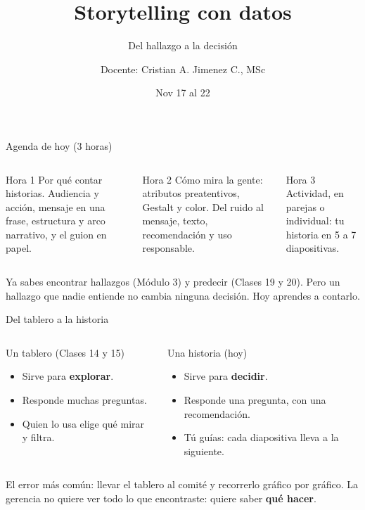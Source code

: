 \documentclass[aspectratio=169,11pt]{beamer}
\title{Storytelling con datos}
\subtitle{Del hallazgo a la decisión}
\author{Docente: Cristian A. Jimenez C., MSc}
\date{Nov 17 al 22}
\begin{document}
{
\begin{frame}
  \titlepage
\end{frame}
}

\begin{frame}[t]{Agenda de hoy (3 horas)}
  \begin{columns}[T,onlytextwidth]
    \begin{block}{Hora 1}
      \small Por qué contar historias. Audiencia y acción, mensaje en una
      frase, estructura y arco narrativo, y el guion en papel.
    \end{block}
    \begin{block}{Hora 2}
      \small Cómo mira la gente: atributos preatentivos, Gestalt y color.
      Del ruido al mensaje, texto, recomendación y uso responsable.
    \end{block}
    \begin{block}{Hora 3}
      \small Actividad, en parejas o individual: tu historia en 5 a 7
      diapositivas.
    \end{block}
  \end{columns}
  \vspace{0.3cm}
  \small Ya sabes encontrar hallazgos (Módulo 3) y predecir (Clases 19 y
  20). Pero un hallazgo que nadie entiende no cambia ninguna decisión. Hoy
  aprendes a contarlo.
\end{frame}

\begin{frame}[t]{Del tablero a la historia}
  \begin{columns}[T,onlytextwidth]
    \begin{block}{Un tablero (Clases 14 y 15)}
      \small
      \begin{itemize}
        \small
        \item Sirve para \textbf{explorar}.
        \item Responde muchas preguntas.
        \item Quien lo usa elige qué mirar y filtra.
      \end{itemize}
    \end{block}
    \begin{exampleblock}{Una historia (hoy)}
      \small
      \begin{itemize}
        \small
        \item Sirve para \textbf{decidir}.
        \item Responde una pregunta, con una recomendación.
        \item Tú guías: cada diapositiva lleva a la siguiente.
      \end{itemize}
    \end{exampleblock}
  \end{columns}
  \vspace{0.3cm}
  \small El error más común: llevar el tablero al comité y recorrerlo
  gráfico por gráfico. La gerencia no quiere ver todo lo que encontraste:
  quiere saber \textbf{qué hacer}.
\end{frame}
\end{document}
